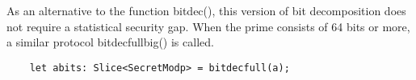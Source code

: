 As an alternative to the function bitdec(), this version of bit decomposition does not require a statistical security gap.
When the prime consists of 64 bits or more, a similar protocol bitdecfullbig() is called. 
\begin{lstlisting}
	let abits: Slice<SecretModp> = bitdecfull(a);
\end{lstlisting}



